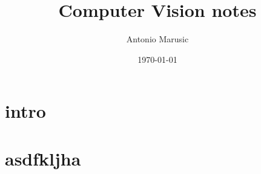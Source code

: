 \documentclass[12pt,oneside,a4paper]{article}
\title{\textbf{Computer Vision notes}}
\author{Antonio Marusic}
\date{\today}
\begin{document}
\maketitle

\section{intro}


\section{asdfkljha}





\end{document}
